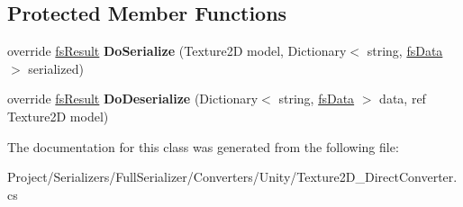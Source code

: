 \subsection*{Protected Member Functions}
\begin{DoxyCompactItemize}
\item 
\mbox{\label{class_full_serializer_1_1_internal_1_1_direct_converters_1_1_texture2_d___direct_converter_a590e355b26ac0221c95ef6475b5b16f6}} 
override \hyperlink{struct_full_serializer_1_1fs_result}{fs\+Result} {\bfseries Do\+Serialize} (Texture2D model, Dictionary$<$ string, \hyperlink{class_full_serializer_1_1fs_data}{fs\+Data} $>$ serialized)
\item 
\mbox{\label{class_full_serializer_1_1_internal_1_1_direct_converters_1_1_texture2_d___direct_converter_ad806f06e5841f395ac5ab613255d8db4}} 
override \hyperlink{struct_full_serializer_1_1fs_result}{fs\+Result} {\bfseries Do\+Deserialize} (Dictionary$<$ string, \hyperlink{class_full_serializer_1_1fs_data}{fs\+Data} $>$ data, ref Texture2D model)
\end{DoxyCompactItemize}


The documentation for this class was generated from the following file\+:\begin{DoxyCompactItemize}
\item 
Project/\+Serializers/\+Full\+Serializer/\+Converters/\+Unity/Texture2\+D\+\_\+\+Direct\+Converter.\+cs\end{DoxyCompactItemize}
